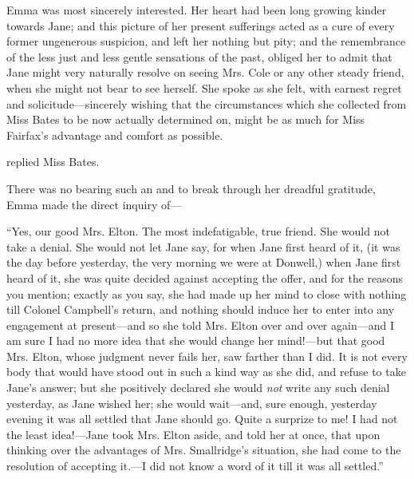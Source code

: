 Emma was most sincerely interested. Her heart had been long growing kinder towards Jane; and this picture of her present sufferings acted as a cure of every former ungenerous suspicion, and left her nothing but pity; and the remembrance of the less just and less gentle sensations of the past, obliged her to admit that Jane might very naturally resolve on seeing Mrs. Cole or any other steady friend, when she might not bear to see herself. She spoke as she felt, with earnest regret and solicitude---sincerely wishing that the circumstances which she collected from Miss Bates to be now actually determined on, might be as much for Miss Fairfax's advantage and comfort as possible. 

 replied Miss Bates. 

There was no bearing such an  and to break through her dreadful gratitude, Emma made the direct inquiry of---




“Yes, our good Mrs. Elton. The most indefatigable, true friend. She would not take a denial. She would not let Jane say,  for when Jane first heard of it, (it was the day before yesterday, the very morning we were at Donwell,) when Jane first heard of it, she was quite decided against accepting the offer, and for the reasons you mention; exactly as you say, she had made up her mind to close with nothing till Colonel Campbell's return, and nothing should induce her to enter into any engagement at present---and so she told Mrs. Elton over and over again---and I am sure I had no more idea that she would change her mind!---but that good Mrs. Elton, whose judgment never fails her, saw farther than I did. It is not every body that would have stood out in such a kind way as she did, and refuse to take Jane's answer; but she positively declared she would {\em not} write any such denial yesterday, as Jane wished her; she would wait---and, sure enough, yesterday evening it was all settled that Jane should go. Quite a surprize to me! I had not the least idea!---Jane took Mrs. Elton aside, and told her at once, that upon thinking over the advantages of Mrs. Smallridge's situation, she had come to the resolution of accepting it.---I did not know a word of it till it was all settled.”


